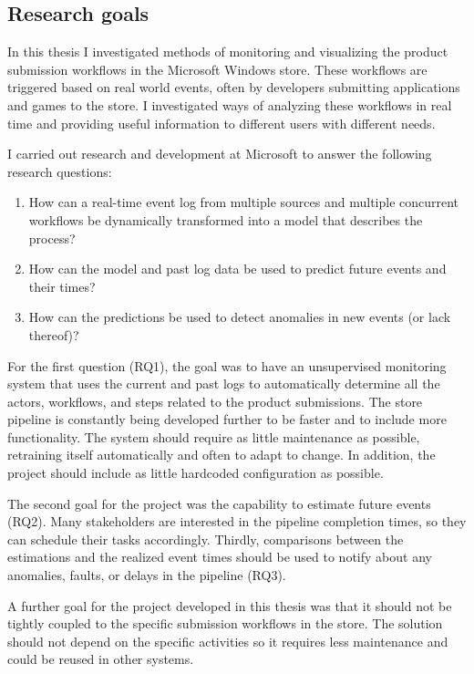 \subsection{Research goals}
In this thesis I investigated methods of monitoring and visualizing the product submission workflows in the Microsoft Windows store.
These workflows are triggered based on real world events, often by developers submitting applications and games to the store.
I investigated ways of analyzing these workflows in real time and providing useful information to different users with different needs. 

I carried out research and development at Microsoft to answer the following research questions:

\begin{enumerate}[label=RQ\arabic*]
    \item How can a real-time event log from multiple sources and multiple concurrent workflows be dynamically transformed into a model that describes the process? 
    \item How can the model and past log data be used to predict future events and their times?
    \item How can the predictions be used to detect anomalies in new events (or lack thereof)?
\end{enumerate}

For the first question (RQ1), the goal was to have an unsupervised monitoring system 
that uses the current and past logs to automatically determine all the actors, 
workflows, and steps related to the product submissions.
The store pipeline is constantly being developed further to be faster and to include more functionality.
The system should require as little maintenance as possible, retraining itself automatically and often to adapt to change.
In addition, the project should include as little hardcoded configuration as possible.

The second goal for the project was the capability to estimate future events (RQ2). 
Many stakeholders are interested in the pipeline completion times, so they can schedule their tasks accordingly.
Thirdly, comparisons between the estimations and the realized event times should be used to notify 
about any anomalies, faults, or delays in the pipeline (RQ3).

A further goal for the project developed in this thesis was that it should not be tightly coupled to the 
specific submission workflows in the store. The solution should not depend on the specific activities so
it requires less maintenance and could be reused in other systems.

